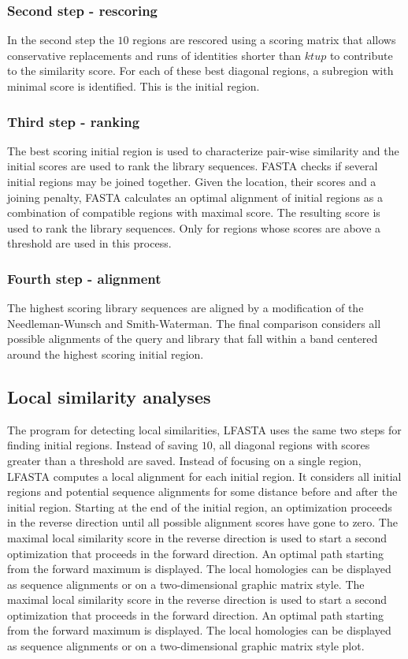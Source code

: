		\subsubsection{Second step - rescoring}
		In the second step the $10$ regions are rescored using a scoring matrix that allows conservative replacements and runs of identities shorter than $ktup$ to contribute to the similarity score.
		For each of these best diagonal regions, a subregion with minimal score is identified.
		This is the initial region.

		\subsubsection{Third step - ranking}
		The best scoring initial region is used to characterize pair-wise similarity and the initial scores are used to rank the library sequences.
		FASTA checks if several initial regions may be joined together.
		Given the location, their scores and a joining penalty, FASTA calculates an optimal alignment of initial regions as a combination of compatible regions with maximal score.
		The resulting score is used to rank the library sequences.
		Only for regions whose scores are above a threshold are used in this process.

		\subsubsection{Fourth step - alignment}
		The highest scoring library sequences are aligned by a modification of the Needleman-Wunsch and Smith-Waterman.
		The final comparison considers all possible alignments of the query and library that fall within a band centered around the highest scoring initial region.

	\subsection{Local similarity analyses}
	The program for detecting local similarities, LFASTA uses the same two steps for finding initial regions.
	Instead of saving $10$, all diagonal regions with scores greater than a threshold are saved.
	Instead of focusing on a single region, LFASTA computes a local alignment for each initial region.
	It considers all initial regions and potential sequence alignments for some distance before and after the initial region.
	Starting at the end of the initial region, an optimization proceeds in the reverse direction until all possible alignment scores have gone to zero.
	The maximal local similarity score in the reverse direction is used to start a second optimization that proceeds in the forward direction.
	An optimal path starting from the forward maximum is displayed.
	The local homologies can be displayed as sequence alignments or on a two-dimensional graphic matrix style.
	The maximal local similarity score in the reverse direction is used to start a second optimization that proceeds in the forward direction.
	An optimal path starting from the forward maximum is displayed.
	The local homologies can be displayed as sequence alignments or on a two-dimensional graphic matrix style plot.

